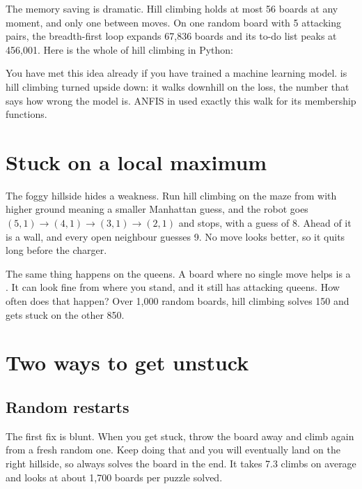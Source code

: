 The memory saving is dramatic. Hill climbing holds at most 56 boards at any moment, and only one between moves. On one random board with 5 attacking pairs, the breadth-first loop expands 67,836 boards and its to-do list peaks at 456,001. Here is the whole of hill climbing in Python:



\begin{libnote}
You have met this idea already if you have trained a machine learning model.  is hill climbing turned upside down: it walks downhill on the loss, the number that says how wrong the model is. ANFIS in  used exactly this walk for its membership functions.
\end{libnote}

\section{Stuck on a local maximum}

The foggy hillside hides a weakness. Run hill climbing on the maze from  with higher ground meaning a smaller Manhattan guess, and the robot goes $(5,1)\to(4,1)\to(3,1)\to(2,1)$ and stops, with a guess of 8. Ahead of it is a wall, and every open neighbour guesses 9. No move looks better, so it quits long before the charger.

The same thing happens on the queens. A board where no single move helps is a . It can look fine from where you stand, and it still has attacking queens. How often does that happen? Over 1,000 random boards, hill climbing solves 150 and gets stuck on the other 850.

\section{Two ways to get unstuck}

\subsection{Random restarts}

The first fix is blunt. When you get stuck, throw the board away and climb again from a fresh random one. Keep doing that and you will eventually land on the right hillside, so  always solves the board in the end. It takes 7.3 climbs on average and looks at about 1,700 boards per puzzle solved.

